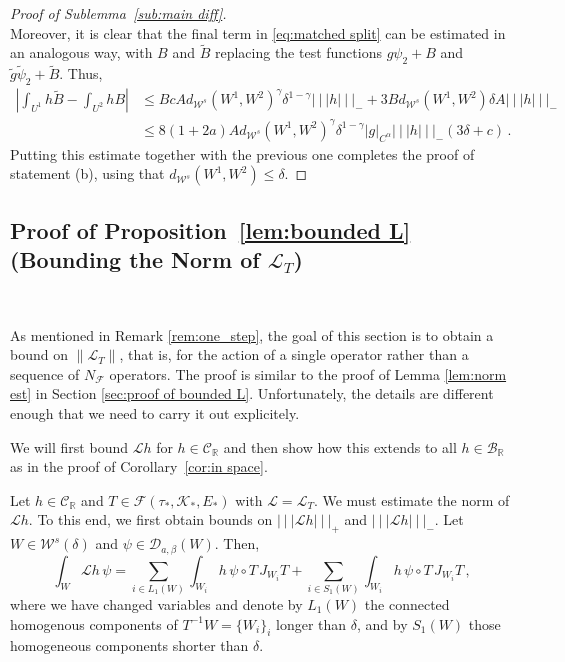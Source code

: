 \documentclass{amsart}
\numberwithin{equation}{section}
\newcommand\cB{{\mathcal B}}
\newcommand\cC{{\mathcal C}}
\newcommand\cD{{\mathcal D}}
\newcommand\cF{{\mathcal F}}
\newcommand\cK{{\mathcal K}}
\newcommand\cL{{\mathcal L}}
\newcommand\cW{{\mathcal W}}
\newcommand\bR{{\mathbb R}}
\newcommand{\tB}{\tilde{B}}
\newcommand{\tg}{\tilde{g}}
\newcommand\tpsi{\tilde{\psi}}
\newcommand{\tri}{{|\:\!\!|\:\!\!|}}
\begin{document}
\begin{proof}[Proof of Sublemma~\ref{sub:main diff}]
\[\]
Moreover, it is clear that the final term in \eqref{eq:matched split} can be estimated in an analogous way, with
$B$ and $\tilde B$ replacing the test functions $g\psi_2 + B$ and $\tg \tpsi_2 + \tB$.  Thus,
\[
\begin{split}
\left| \int_{U^1} h \tB - \int_{U^2} h B \right| 
& \le B cA d_{\cW^s}(W^1, W^2)^\gamma \delta^{1-\gamma} \tri h \tri_- + 3B d_{\cW^s}(W^1, W^2) \delta A \tri h \tri_- \\
& \le 8(1+2a) A d_{\cW^s}(W^1, W^2)^\gamma \delta^{1-\gamma} |g|_{C^\alpha} \tri h \tri_- (3\delta + c) \, .
\end{split}
\]
Putting this estimate together with the previous one completes the proof of statement (b), using that
$d_{\cW^s}(W^1, W^2) \le \delta$.
\end{proof}



\subsection{Proof of Proposition~\ref{lem:bounded L} (Bounding the Norm of $\cL_T$) }\ \\
\label{sec:proof of bounded L}

As mentioned in Remark \ref{rem:one_step}, the goal of this section is to obtain a bound on $\|\cL_T\|$, that is, for the action of a single operator rather than a sequence of $N_\cF$ operators. The proof is similar to the proof of Lemma \ref{lem:norm est} in Section \ref{sec:proof of bounded L}. Unfortunately, the details are different enough that we need to carry it out explicitely.

We will first bound $\cL h$ for $h \in \cC_{\bR}$ and then show how this 
extends to all $h \in \cB_{\bR}$ as in the proof of Corollary~\ref{cor:in space}.

Let $h \in \cC_{\bR}$ and $T \in \cF(\tau_*, \cK_*, E_*)$ with $\cL = \cL_T$.  We must estimate 
the norm of $\cL h$.  To this end, we first obtain bounds on $\tri \cL h \tri_+$ and $\tri \cL h \tri _-$.
Let $W \in \cW^s(\delta)$ and $\psi \in \cD_{a,\beta}(W)$.  Then,
\begin{equation}
\label{eq:first change}
\int_W \cL h \, \psi  = \sum_{i \in L_1(W)} \int_{W_i} h \, \psi \circ T \, J_{W_i}T 
+ \sum_{i \in S_1(W)} \int_{W_i} h \, \psi \circ T \, J_{W_i}T  \, ,
\end{equation}
where we have changed variables and denote by $L_1(W)$ the connected homogenous components
of $T^{-1}W = \{ W_i \}_i$ longer than $\delta$, and by $S_1(W)$ those homogeneous components shorter than 
$\delta$.
\end{document}
